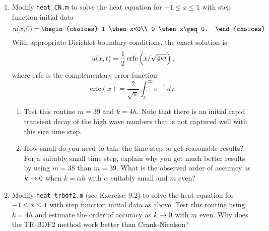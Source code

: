 

\begin{enumerate}

\item Modify \verb+heat_CN.m+ to solve the heat equation for
$-1\leq x \leq 1$ with step function  initial data
\begin{equation} \label{9.3a}
u(x,0) = \begin{choices}  1 \when x<0\\  0 \when x\geq 0. \end{choices}
\end{equation} 
With appropriate Dirichlet boundary conditions, the exact solution is
\begin{equation} \label{9.3b}
u(x,t) = \frac{1}{2} \, \text{erfc} \left(x / \sqrt{4 \kappa t}\right),
\end{equation} 
where erfc is the complementary error function
\[
\text{erfc}(x) = \frac{2}{\sqrt{\pi}} \int_x^\infty e^{-z^2}\,dz.
\]

\begin{enumerate}
\item
Test this routine $m=39$ and $k = 4h$.  Note that there is an initial rapid
transient decay of the high wave numbers that is not captured well with this
size time step.

\item
How small do you need to take the time step to get reasonable results?
For a suitably small time step, explain why you get much better results by
using $m=38$ than $m=39$.  What is the observed order of accuracy as $k\rightarrow
0$ when $k = \alpha h$ with $\alpha$ suitably small and $m$ even?

\end{enumerate}

\item Modify \verb+heat_trbdf2.m+ (see Exercise~9.2)
to solve the heat equation for
$-1\leq x \leq 1$ with step function  initial data as above.
Test this routine using $k=4h$ and estimate the order of accuracy as $k\rightarrow
0$ with $m$ even.  Why does the TR-BDF2 method work better than
Crank-Nicolson?

\end{enumerate} 
